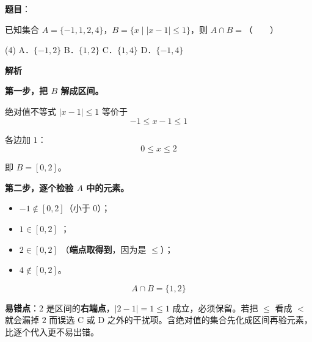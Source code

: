 \begin{answer}

\textbf{题目}：

已知集合 $A=\{-1,1,2,4\}$，$B=\{x\mid|x-1|\le1\}$，则 $A\cap B=$\mbox{（　　）}

\begin{gkopts}(4)
\task A．$\{-1,2\}$
\task B．$\{1,2\}$
\task C．$\{1,4\}$
\task D．$\{-1,4\}$
\end{gkopts}

\textbf{解析}

\textbf{第一步，把 $B$ 解成区间。}

绝对值不等式 $|x-1|\le1$ 等价于
\nopagebreak[4]
\[-1\le x-1\le1\]

各边加 $1$：
\nopagebreak[4]
\[0\le x\le2\]

即 $B=[0,2]$。

\textbf{第二步，逐个检验 $A$ 中的元素。}

\begin{itemize}
\item $-1\notin[0,2]$（小于 $0$）；
\item $1\in[0,2]$ ；
\item $2\in[0,2]$ （\textbf{端点取得到}，因为是 $\le$）；
\item $4\notin[0,2]$。
\end{itemize}

\nopagebreak[4]
\[A\cap B=\{1,2\}\]

\begin{gktip}
\textbf{易错点}：$2$ 是区间的\textbf{右端点}，$|2-1|=1\le1$ 成立，必须保留。若把 $\le$ 看成 $<$ 就会漏掉 $2$ 而误选 C 或 D 之外的干扰项。含绝对值的集合先化成区间再验元素，比逐个代入更不易出错。
\end{gktip}


\par\medskip

\end{answer}
